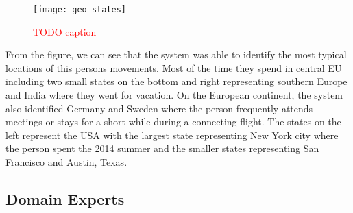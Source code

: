 \begin{figure}[h!]
	\centering
	\texttt{[image: geo-states]}
	\caption{\textcolor{red}{TODO caption}}
	\label{fig:example-geo}
\end{figure}

From the figure, we can see that the system was able to identify the most typical locations of this persons
movements. Most of the time they spend in central EU including two small states on the bottom and right
representing southern Europe and India where they went for vacation. On the European continent, the system
also identified Germany and Sweden where the person frequently attends meetings or stays for a short while
during a connecting flight. The states on the left represent the USA with the largest state representing New
York city where the person spent the 2014 summer and the smaller states representing San Francisco and Austin,
Texas.

\subsection{Domain Experts}